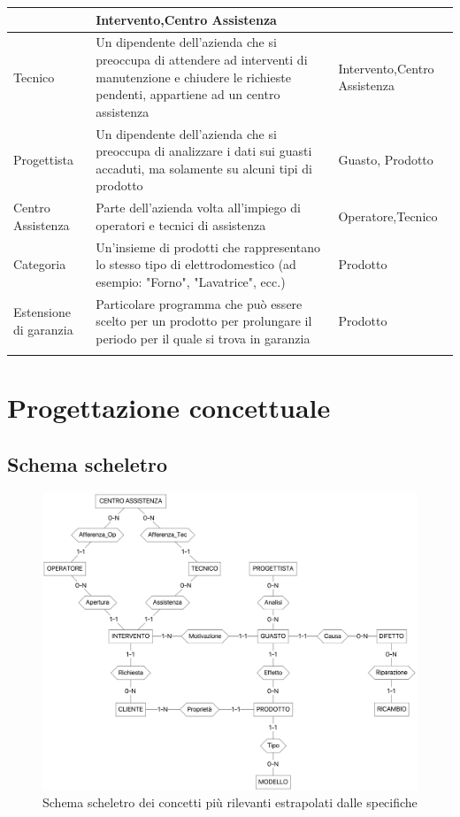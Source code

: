 \documentclass[a4paper, 12pt]{report}
\begin{document}
\begin{tabularx}{\linewidth}{>{\hsize=0.375\hsize}X|X|>{\hsize=0.475\hsize}X}
	& Intervento,\newline Centro Assistenza\\
	\hline
	Tecnico & Un dipendente dell'azienda che si preoccupa di attendere ad interventi di manutenzione e chiudere le richieste pendenti, appartiene
	ad un centro assistenza & Intervento,\newline Centro Assistenza\\
	\hline
	Progettista & Un dipendente dell'azienda che si preoccupa di analizzare i dati sui guasti accaduti, ma solamente su alcuni tipi
	di prodotto & Guasto, Prodotto\\
	\hline
	Centro Assistenza & Parte dell'azienda volta all'impiego di operatori e tecnici di assistenza & Operatore,\newline Tecnico\\
	\hline
	Categoria & Un'insieme di prodotti che rappresentano lo stesso tipo di elettrodomestico (ad esempio: "Forno", "Lavatrice", ecc.) & Prodotto\\
	\hline
	Estensione di garanzia & Particolare programma che può essere scelto per un prodotto per prolungare il periodo per il quale si trova in garanzia & Prodotto\\
	\hline
	\caption{Glossario dei termini}
\end{tabularx}

\chapter{Progettazione concettuale}

\section{Schema scheletro}

\begin{figure}[H]
	\centering
	\includegraphics[width=\linewidth]{images/skeleton.png}
	\caption{Schema scheletro dei concetti più rilevanti estrapolati dalle specifiche}
\end{figure}
\end{document}
